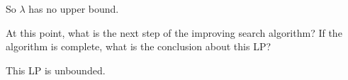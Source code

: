 \documentclass[12pt]{exam}
\begin{document}
\begin{questions}
\begin{parts}
\begin{subparts}
\begin{solution}
So $\lambda$ has no upper bound.

\end{solution}

\subpart[5] At this point, what is the next step of the improving search algorithm? If the algorithm is complete, what is the conclusion about this LP?

\begin{solution}
This LP is unbounded.
\end{solution}

\end{subparts}








\end{parts}
\end{questions}
\end{document}
